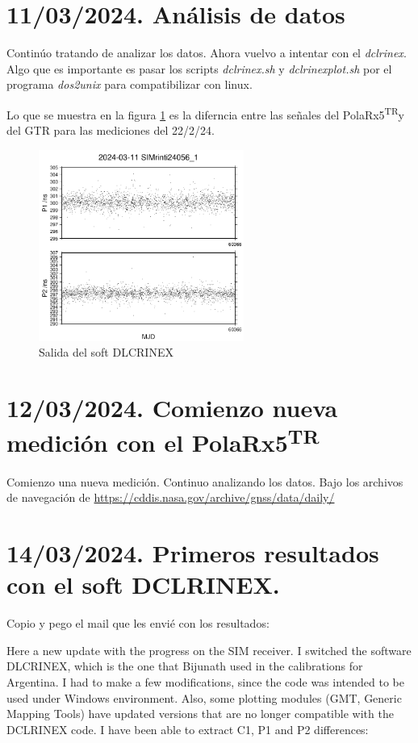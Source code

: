 \documentclass[11pt]{article}
\newcommand{\polar}[0]{PolaRx5\textsuperscript{TR}}
\begin{document}
\section{11/03/2024. Análisis de datos}
Continúo tratando de analizar los datos. Ahora vuelvo a intentar con el \textit{dclrinex}. Algo que es importante es pasar los scripts \textit{dclrinex.sh} y \textit{dclrinexplot.sh}  por el programa \textit{dos2unix} para compatibilizar con linux.

Lo que se muestra en la figura \ref{fig:capturaDLCRINEX} es la diferncia entre las señales del \polar y del GTR para las mediciones del 22/2/24.

\begin{figure}[ht]
    \begin{center}
        \includegraphics[width=0.6\textwidth]{./figuras/capturaDLCRINEX.png}
        \caption{Salida del soft DLCRINEX}
        \label{fig:capturaDLCRINEX}
    \end{center}
\end{figure}


\section{12/03/2024. Comienzo nueva medición con el \polar}
Comienzo una nueva medición. Continuo analizando los datos. Bajo los archivos de navegación de \url{https://cddis.nasa.gov/archive/gnss/data/daily/}

\section{14/03/2024. Primeros resultados con el soft DCLRINEX.}

Copio y pego el mail que les envié con los resultados:

Here a new update with the progress on the SIM receiver.
I switched the software DLCRINEX, which is the one that Bijunath used in the calibrations for Argentina. I had to make a few modifications, since the code was intended to be used under Windows environment. Also, some plotting modules (GMT, Generic Mapping Tools) have updated versions that are no longer compatible with the DCLRINEX code.
I have been able to extract C1, P1 and P2 differences:
\end{document}
